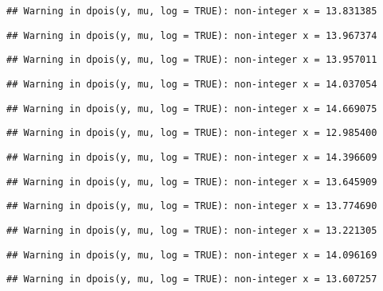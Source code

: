 \documentclass[
]{article}
\begin{document}
\begin{verbatim}
## Warning in dpois(y, mu, log = TRUE): non-integer x = 13.831385
\end{verbatim}

\begin{verbatim}
## Warning in dpois(y, mu, log = TRUE): non-integer x = 13.967374
\end{verbatim}

\begin{verbatim}
## Warning in dpois(y, mu, log = TRUE): non-integer x = 13.957011
\end{verbatim}

\begin{verbatim}
## Warning in dpois(y, mu, log = TRUE): non-integer x = 14.037054
\end{verbatim}

\begin{verbatim}
## Warning in dpois(y, mu, log = TRUE): non-integer x = 14.669075
\end{verbatim}

\begin{verbatim}
## Warning in dpois(y, mu, log = TRUE): non-integer x = 12.985400
\end{verbatim}

\begin{verbatim}
## Warning in dpois(y, mu, log = TRUE): non-integer x = 14.396609
\end{verbatim}

\begin{verbatim}
## Warning in dpois(y, mu, log = TRUE): non-integer x = 13.645909
\end{verbatim}

\begin{verbatim}
## Warning in dpois(y, mu, log = TRUE): non-integer x = 13.774690
\end{verbatim}

\begin{verbatim}
## Warning in dpois(y, mu, log = TRUE): non-integer x = 13.221305
\end{verbatim}

\begin{verbatim}
## Warning in dpois(y, mu, log = TRUE): non-integer x = 14.096169
\end{verbatim}

\begin{verbatim}
## Warning in dpois(y, mu, log = TRUE): non-integer x = 13.607257
\end{verbatim}
\end{document}
